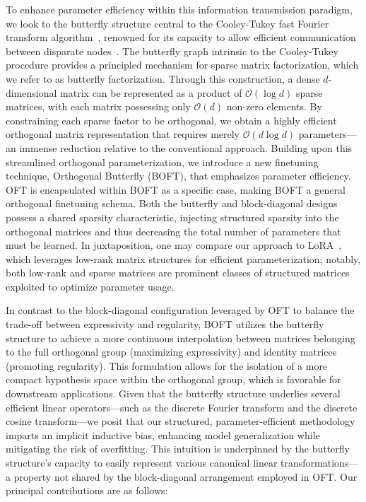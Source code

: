 To enhance parameter efficiency within this information transmission paradigm, we look to the butterfly structure central to the Cooley-Tukey fast Fourier transform algorithm~\cite{cooley1965algorithm}, renowned for its capacity to allow efficient communication between disparate nodes~\cite{klasing1994broadcasting}. The butterfly graph intrinsic to the Cooley-Tukey procedure provides a principled mechanism for sparse matrix factorization, which we refer to as butterfly factorization. Through this construction, a dense $d$-dimensional matrix can be represented as a product of $\mathcal{O}(\log d)$ sparse matrices, with each matrix possessing only $\mathcal{O}(d)$ non-zero elements. By constraining each sparse factor to be orthogonal, we obtain a highly efficient orthogonal matrix representation that requires merely $\mathcal{O}(d\log d)$ parameters—an immense reduction relative to the conventional approach. Building upon this streamlined orthogonal parameterization, we introduce a new finetuning technique, Orthogonal Butterfly (BOFT), that emphasizes parameter efficiency. OFT is encapsulated within BOFT as a specific case, making BOFT a general orthogonal finetuning schema. Both the butterfly and block-diagonal designs possess a shared sparsity characteristic, injecting structured sparsity into the orthogonal matrices and thus decreasing the total number of parameters that must be learned. In juxtaposition, one may compare our approach to LoRA~\cite{hulora2022}, which leverages low-rank matrix structures for efficient parameterization; notably, both low-rank and sparse matrices are prominent classes of structured matrices~\cite{candes2011robust} exploited to optimize parameter usage.

In contrast to the block-diagonal configuration leveraged by OFT to balance the trade-off between expressivity and regularity, BOFT utilizes the butterfly structure to achieve a more continuous interpolation between matrices belonging to the full orthogonal group (maximizing expressivity) and identity matrices (promoting regularity). This formulation allows for the isolation of a more compact hypothesis space within the orthogonal group, which is favorable for downstream applications. Given that the butterfly structure underlies several efficient linear operators—such as the discrete Fourier transform and the discrete cosine transform—we posit that our structured, parameter-efficient methodology imparts an implicit inductive bias, enhancing model generalization while mitigating the risk of overfitting. This intuition is underpinned by the butterfly structure's capacity to easily represent various canonical linear transformations—a property not shared by the block-diagonal arrangement employed in OFT. Our principal contributions are as follows:

